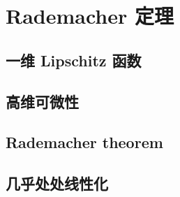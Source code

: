 \section{Rademacher 定理}
\label{b1:sec:1602}


\subsection{一维 Lipschitz 函数}
\label{b1:subsec:160201}

\subsection{高维可微性}
\label{b1:subsec:160202}

\subsection{Rademacher theorem}
\label{b1:subsec:160203}

\subsection{几乎处处线性化}
\label{b1:subsec:160204}



